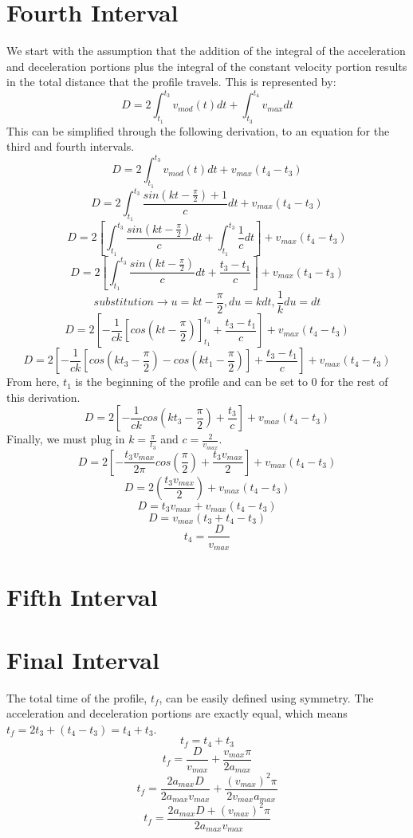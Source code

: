 \documentclass[a4paper,12pt]{report}
\newcommand{\tab}{\hspace{20pt}}
\begin{document}
	\section{Fourth Interval}
	\tab We start with the assumption that the addition of the integral of the acceleration and deceleration portions plus the integral of the constant velocity portion results in the total distance that the profile travels. This is represented by:
	\[D = 2\int_{t_1}^{t_3}v_{mod}(t)dt + \int_{t_3}^{t_4}v_{max}dt\]
	\tab This can be simplified through the following derivation, to an equation for the third and fourth intervals.
	\[D = 2\int_{t_1}^{t_3}v_{mod}(t)dt + v_{max}(t_4 - t_3)\]
	\[D = 2\int_{t_1}^{t_3}\frac{sin(kt - \frac{\pi}{2}) + 1}{c}dt + v_{max}(t_4 - t_3)\]
	\[D = 2\left[\int_{t_1}^{t_3}\frac{sin(kt - \frac{\pi}{2})}{c}dt + \int_{t_1}^{t_3}\frac{1}{c}dt\right] + v_{max}(t_4 - t_3)\]
	\[D = 2\left[\int_{t_1}^{t_3}\frac{sin(kt - \frac{\pi}{2})}{c}dt + \frac{t_3 - t_1}{c}\right] + v_{max}(t_4 - t_3)\]
	\[substitution \rightarrow u = kt - \frac{\pi}{2}, du = kdt, \frac{1}{k}du = dt\]
	\[D = 2\left[-\frac{1}{ck}\left[cos(kt - \frac{\pi}{2})\right]_{t_1}^{t_3} + \frac{t_3 - t_1}{c}\right] + v_{max}(t_4 - t_3)\]
	\[D = 2\left[-\frac{1}{ck}\left[cos(kt_3 - \frac{\pi}{2}) - cos(kt_1 - \frac{\pi}{2})\right] + \frac{t_3 - t_1}{c}\right] + v_{max}(t_4 - t_3)\]
	\tab From here, $t_1$ is the beginning of the profile and can be set to 0 for the rest of this derivation.
	\[D = 2\left[-\frac{1}{ck}cos(kt_3 - \frac{\pi}{2}) + \frac{t_3}{c}\right] + v_{max}(t_4 - t_3)\]
	\tab Finally, we must plug in $k = \frac{\pi}{t_3}$ and $c = \frac{2}{v_{max}}$.
	\[D = 2\left[-\frac{t_3v_{max}}{2\pi}cos(\frac{\pi}{2}) + \frac{t_3v_{max}}{2}\right] + v_{max}(t_4 - t_3)\]
	\[D = 2(\frac{t_3v_{max}}{2}) + v_{max}(t_4 - t_3)\]
	\[D = t_3v_{max} + v_{max}(t_4 - t_3)\]
	\[D = v_{max}(t_3 + t_4 - t_3)\]
	\[t_4 = \frac{D}{v_{max}}\]
	
	\section{Fifth Interval}
	\tab 
	
	\section{Final Interval}
	\tab The total time of the profile, $t_f$, can be easily defined using symmetry. The acceleration and deceleration portions are exactly equal, which means $t_f = 2t_3 + (t_4 - t_3) = t_4 + t_3$.
	\[t_f = t_4 + t_3\]
	\[t_f = \frac{D}{v_{max}} + \frac{v_{max}\pi}{2a_{max}}\]
	\[t_f = \frac{2a_{max}D}{2a_{max}v_{max}} + \frac{(v_{max})^2\pi}{2v_{max}a_{max}}\]
	\[t_f = \frac{2a_{max}D + (v_{max})^2\pi}{2a_{max}v_{max}}\]
	
\end{document}
